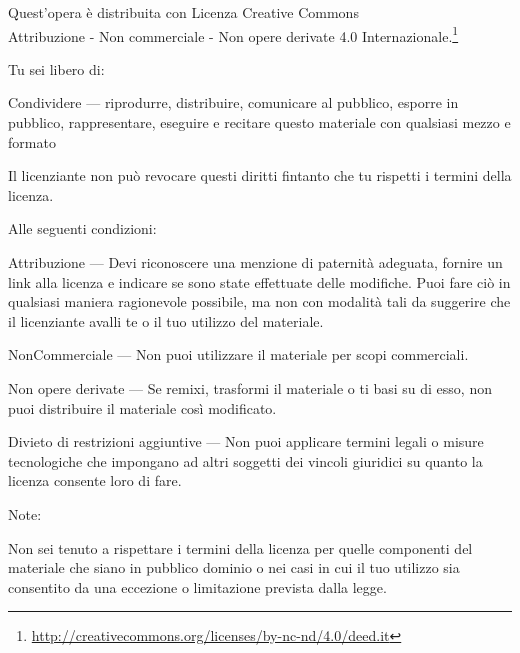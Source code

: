 \cleartorecto
\thispagestyle{plain}

{\fontsize{9}{13}\selectfont%
\setlength{\parindent}{0pt}%
\raggedright\label{copyright-details}%
\setlength{\parskip}{7pt}%

{\centering

{\LARGE\ccbyncnd}

Quest'opera è distribuita con Licenza Creative Commons\\
Attribuzione - Non commerciale - Non opere derivate 4.0 Internazionale.\footnote{%
\href{http://creativecommons.org/licenses/by-nc-nd/4.0/deed.it}{http://creativecommons.org/licenses/by-nc-nd/4.0/deed.it}}

}

Tu sei libero di:

\begin{packeditemize}
\item Condividere — riprodurre, distribuire, comunicare al pubblico, esporre in pubblico, rappresentare, eseguire e recitare questo materiale con qualsiasi mezzo e formato
\end{packeditemize}

Il licenziante non può revocare questi diritti fintanto che tu rispetti i termini della licenza.

Alle seguenti condizioni:

\begin{packeditemize}
\item Attribuzione — Devi riconoscere una menzione di paternità adeguata, fornire un link alla licenza e indicare se sono state effettuate delle modifiche. Puoi fare ciò in qualsiasi maniera ragionevole possibile, ma non con modalità tali da suggerire che il licenziante avalli te o il tuo utilizzo del materiale.
\item NonCommerciale — Non puoi utilizzare il materiale per scopi commerciali.
\item Non opere derivate — Se remixi, trasformi il materiale o ti basi su di esso, non puoi distribuire il materiale così modificato.
\end{packeditemize}

Divieto di restrizioni aggiuntive — Non puoi applicare termini legali o misure
tecnologiche che impongano ad altri soggetti dei vincoli giuridici su quanto la
licenza consente loro di fare.

Note:

Non sei tenuto a rispettare i termini della licenza per quelle componenti del
materiale che siano in pubblico dominio o nei casi in cui il tuo utilizzo sia
consentito da una eccezione o limitazione prevista dalla legge.

}
